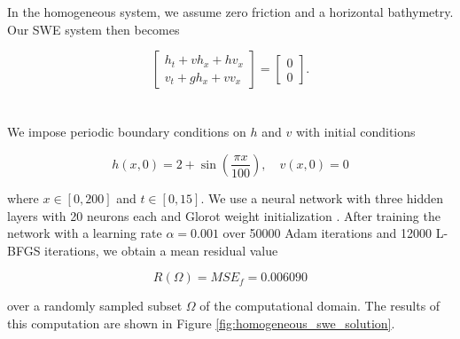 In the homogeneous system, we assume zero friction and a horizontal bathymetry. Our SWE system then becomes

$$
\renewcommand*{\arraystretch}{1.5}\begin{bmatrix}
    
    h_t + v h_x + h v_x \\
    v_t + g h_x + v v_x
\end{bmatrix} = \begin{bmatrix}
    0 \\
    0
\end{bmatrix}.
$$
\ \\\\
\noindent We impose periodic boundary conditions on $h$ and $v$ with initial conditions

$$
h(x, 0) = 2 + \sin{\left( \frac{\pi x}{100} \right)}, \quad v(x, 0) = 0
$$

\noindent where $x \in [0, 200]$ and $t \in [0, 15]$. We use a neural network with three hidden layers with 20 neurons 
each and Glorot weight initialization \cite{glorot2010understanding}. After training the network with a learning rate
$\alpha = 0.001$ over 50000 Adam iterations and 12000 L-BFGS iterations, we obtain a mean residual value

$$
R(\Omega) = MSE_f = 0.006090
$$

\noindent over a randomly sampled subset $\Omega$ of the computational domain. The results of this computation are shown 
in Figure \ref{fig:homogeneous_swe_solution}.

